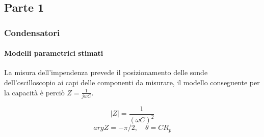 \subsection{Parte 1}



\subsubsection{Condensatori}

\paragraph{Modelli parametrici stimati}

La misura dell'impendenza prevede il posizionamento delle sonde dell'oscilloscopio ai capi delle componenti da misurare, il modello conseguente per la capacità è perciò $ Z = \tfrac{1}{jwC} $.





$$ |Z| = \frac{1}{(\omega C)^2}$$
$$ arg Z = - \pi/2, \quad \theta = CR_{p} $$




